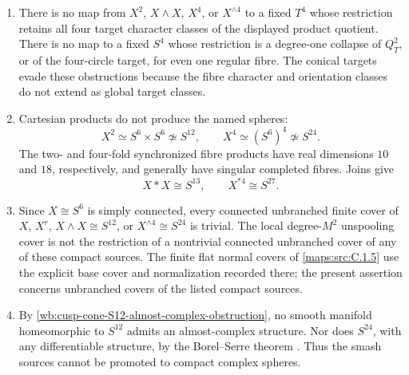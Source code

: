 \begin{theorem}
\begin{enumerate}
\item There is no map from \(X^2\), \(X\wedge X\), \(X^4\), or
\(X^{\wedge4}\) to a fixed \(T^4\) whose restriction retains all four
target character classes of the displayed product quotient.  There is no
map to a fixed \(S^4\) whose restriction is a degree-one collapse of
\(Q_T^2\), or of the four-circle target, for even one regular fibre.  The
conical targets evade these obstructions because the fibre character and
orientation classes do not extend as global target classes.

\item Cartesian products do not produce the named spheres:
\begin{equation}
 X^2\simeq S^6\times S^6\not\simeq S^{12},\qquad
 X^4\simeq(S^6)^4\not\simeq S^{24}.
 \label{wb:cusp-cone-products-not-spheres}
\end{equation}
The two- and four-fold synchronized fibre products have real dimensions
\(10\) and \(18\), respectively, and generally have singular completed
fibres.  Joins give
\begin{equation}
 X*X\cong S^{13},\qquad X^{*4}\cong S^{27}.
 \label{wb:cusp-cone-join-dimensions}
\end{equation}

\item Since \(X\cong S^6\) is simply connected, every connected unbranched
finite cover of \(X\), \(X^r\), \(X\wedge X\cong S^{12}\), or
\(X^{\wedge4}\cong S^{24}\) is trivial.  The local degree-\(M^2\)
unspooling cover is not the restriction of a nontrivial connected
unbranched cover of any of these compact sources.  The finite flat normal covers of \cref{maps:src:C.1.5} use the explicit base cover and normalization recorded there; the present assertion concerns unbranched covers of the listed compact sources.

\item By \cref{wb:cusp-cone-S12-almost-complex-obstruction}, no smooth manifold
homeomorphic to \(S^{12}\) admits an almost-complex structure.  Nor does
\(S^{24}\), with any differentiable structure, by the Borel--Serre theorem
\cite[\S15, Proposition~15.1 and the following remark,
p.~434]{BorelSerre1953}.  Thus the smash sources cannot be promoted to
compact complex spheres.
\end{enumerate}
\end{theorem}



